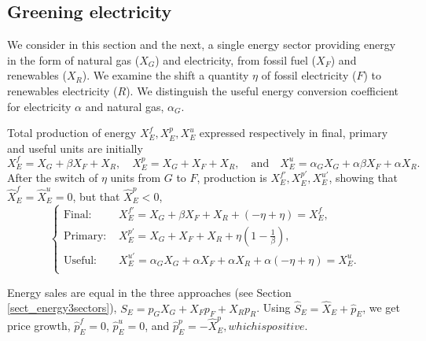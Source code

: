 \documentclass[11pt]{article}
\begin{document}
\subsection{Greening electricity}
\label{sect_greening_elec}
We consider in this section and the next, a single energy sector providing energy in the form of natural gas ($X_G$) and electricity, from fossil fuel ($X_F$) and renewables ($X_R$). We examine the shift a quantity $\eta$ of fossil electricity ($F$) to renewables electricity ($R$). We distinguish the useful energy conversion coefficient for electricity $\alpha$ and natural gas, $\alpha_G$.

Total production of energy $X_E^f,X_E^p,X_E^u$ expressed respectively in final, primary and useful units are initially
\[
X_E^f=X_G+\beta X_F+X_R, \quad X_E^p=X_G+ X_F+X_R, \quad \text{and} \quad  X_E^u=\alpha_G X_G+ \alpha\beta X_F+\alpha X_R.
\]
After the switch of $\eta$ units from $G$ to $F$, production is  $X_E^{f'},X_E^{p'},X_E^{u'}$, showing that $\hat{X}_E^f=\hat{X}_E^u=0$, but that $\hat{X}_E^p<0$,
\begin{equation*}
    \begin{cases}
        \text{Final: }& X_E^{f'}=X_G+\beta X_F+X_R + (-\eta + \eta)=X_E^f,\\
         \text{Primary: }& X_E^{p'}= X_G+ X_F+X_R +  \eta(1-\frac{1}{\beta}), \\
        \text{Useful: }& X_E^{u'}=\alpha_G X_G+ \alpha X_F+\alpha X_R + \alpha(-\eta + \eta )= X_E^u.  \\
    \end{cases}
\end{equation*}


Energy sales are equal in the three approaches (see Section \ref{sect_energy3sectors}),
$S_E=p_GX_G+ X_Fp_F+X_Rp_R$. Using $\hat{S}_E = \hat{X}_E + \hat{p}_E$, we get price growth, $\hat{p}_E^f = 0$, $\hat{p}_E^u = 0$, and $\hat{p}_E^p = -\hat{X}_E^p, which is positive.$
\end{document}
